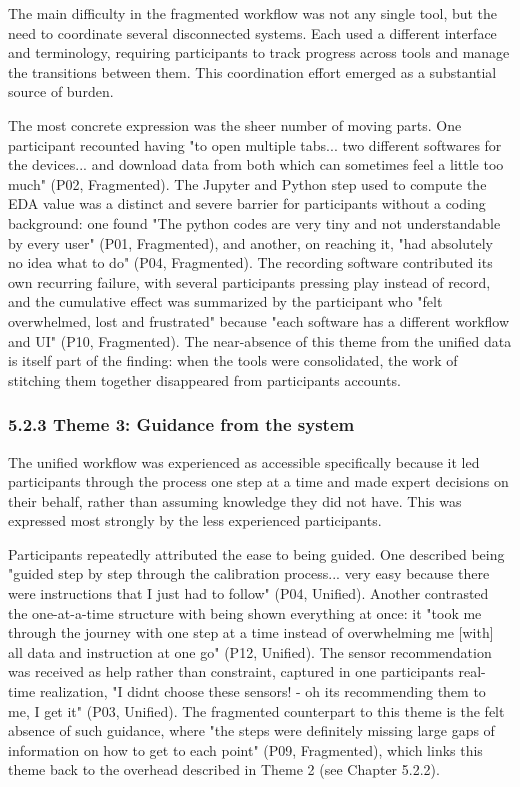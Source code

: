 \documentclass[
]{article}
\begin{document}
The main difficulty in the fragmented workflow was not any single tool, but the need to coordinate several disconnected systems. Each used a different interface and terminology, requiring participants to track progress across tools and manage the transitions between them. This coordination effort emerged as a substantial source of burden.

The most concrete expression was the sheer number of moving parts. One participant recounted having "to open multiple tabs... two different softwares for the devices... and download data from both which can sometimes feel a little too much" (P02, Fragmented). The Jupyter and Python step used to compute the EDA value was a distinct and severe barrier for participants without a coding background: one found "The python codes are very tiny and not understandable by every user" (P01, Fragmented), and another, on reaching it, "had absolutely no idea what to do" (P04, Fragmented). The recording software contributed its own recurring failure, with several participants pressing play instead of record, and the cumulative effect was summarized by the participant who "felt overwhelmed, lost and frustrated" because "each software has a different workflow and UI" (P10, Fragmented). The near-absence of this theme from the unified data is itself part of the finding: when the tools were consolidated, the work of stitching them together disappeared from participants\textquotesingle{} accounts.

\hypertarget{theme-3-guidance-from-the-system}{%
\subsubsection{5.2.3 Theme 3: Guidance from the system}\label{theme-3-guidance-from-the-system}}

The unified workflow was experienced as accessible specifically because it led participants through the process one step at a time and made expert decisions on their behalf, rather than assuming knowledge they did not have. This was expressed most strongly by the less experienced participants.

Participants repeatedly attributed the ease to being guided. One described being "guided step by step through the calibration process... very easy because there were instructions that I just had to follow" (P04, Unified). Another contrasted the one-at-a-time structure with being shown everything at once: it "took me through the journey with one step at a time instead of overwhelming me {[}with{]} all data and instruction at one go" (P12, Unified). The sensor recommendation was received as help rather than constraint, captured in one participant\textquotesingle s real-time realization, "I didn\textquotesingle t choose these sensors! - oh it\textquotesingle s recommending them to me, I get it" (P03, Unified). The fragmented counterpart to this theme is the felt absence of such guidance, where "the steps were definitely missing large gaps of information on how to get to each point" (P09, Fragmented), which links this theme back to the overhead described in Theme 2 (see Chapter 5.2.2).
\end{document}

